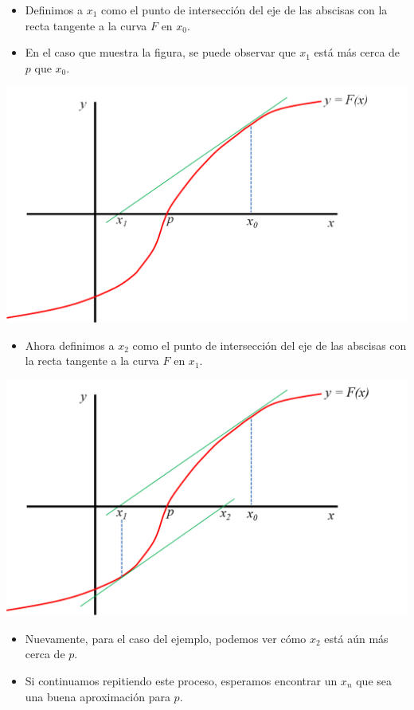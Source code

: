 \documentclass[openany]{book}
\providecommand{\tightlist}{%
  \setlength{\itemsep}{0pt}\setlength{\parskip}{0pt}}
\begin{document}
\begin{itemize}
\tightlist
\item
  Definimos a \(x_1\) como el punto de intersección del eje de las abscisas con la recta tangente a la curva \(F\) en \(x_0\).
\item
  En el caso que muestra la figura, se puede observar que \(x_1\) está más cerca de \(p\) que \(x_0\).
\end{itemize}

\begin{center}\includegraphics[width=0.9\linewidth]{Plots/U2/nr2} \end{center}

\begin{itemize}
\tightlist
\item
  Ahora definimos a \(x_2\) como el punto de intersección del eje de las abscisas con la recta tangente a la curva \(F\) en \(x_1\).
\end{itemize}

\begin{center}\includegraphics[width=0.9\linewidth]{Plots/U2/nr3} \end{center}

\begin{itemize}
\tightlist
\item
  Nuevamente, para el caso del ejemplo, podemos ver cómo \(x_2\) está aún más cerca de \(p\).
\item
  Si continuamos repitiendo este proceso, esperamos encontrar un \(x_n\) que sea una buena aproximación para \(p\).
\end{itemize}
\end{document}
